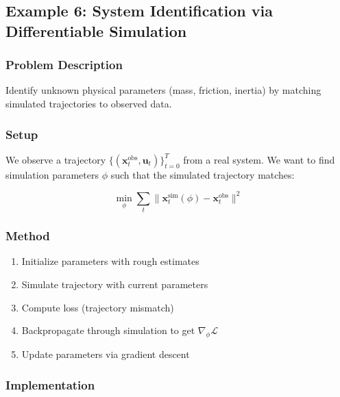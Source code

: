 \subsection{Example 6: System Identification via Differentiable Simulation}

\subsubsection{Problem Description}

Identify unknown physical parameters (mass, friction, inertia) by matching simulated trajectories to observed data.

\subsubsection{Setup}

We observe a trajectory $\{(\mathbf{x}_t^{\text{obs}}, \mathbf{u}_t)\}_{t=0}^{T}$ from a real system. We want to find simulation parameters $\phi$ such that the simulated trajectory matches:

\begin{equation}
\min_\phi \sum_t \| \mathbf{x}_t^{\text{sim}}(\phi) - \mathbf{x}_t^{\text{obs}} \|^2
\end{equation}

\subsubsection{Method}

\begin{enumerate}
    \item Initialize parameters with rough estimates
    \item Simulate trajectory with current parameters
    \item Compute loss (trajectory mismatch)
    \item Backpropagate through simulation to get $\nabla_\phi \mathcal{L}$
    \item Update parameters via gradient descent
\end{enumerate}

\subsubsection{Implementation}


